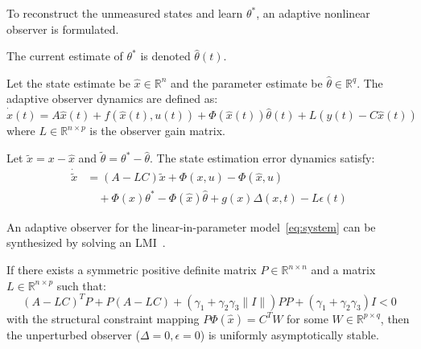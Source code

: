 \documentclass[letterpaper, 10 pt, conference]{ieeeconf}  %
\begin{document}



To reconstruct the unmeasured states and learn $\theta^*$, an adaptive nonlinear observer is formulated. 

The current estimate of $\theta^*$ is denoted $\hat\theta(t)$.

\begin{definition}
Let the state estimate be $\hat{x} \in \mathbb{R}^n$ and the parameter estimate be $\hat{\theta} \in \mathbb{R}^q$. The adaptive observer dynamics are defined as:
\begin{equation}
\dot{\hat{x}}(t) = A\hat{x}(t) + f(\hat{x}(t), u(t)) + \Phi(\hat{x}(t))\hat{\theta}(t) + L(y(t) - C\hat{x}(t))
\end{equation}
where $L \in \mathbb{R}^{n \times p}$ is the observer gain matrix. 
\end{definition}

Let $\tilde{x} = x - \hat{x}$ and $\tilde{\theta} = \theta^* - \hat{\theta}$. The state estimation error dynamics satisfy:
\begin{align}
\dot{\tilde{x}} &= (A-LC)\tilde{x} + \Phi(x,u) - \Phi(\hat{x},u) \nonumber \\
&\quad + \Phi(x)\theta^* - \Phi(\hat{x})\hat{\theta} + g(x)\Delta(x,t) - L\epsilon(t)
\end{align}

An adaptive observer for the linear-in-parameter model~\eqref{eq:system} can be synthesized by solving an LMI~\cite{cho1997systematic, besanccon2000remarks}.

If there exists a symmetric positive definite matrix $P \in \mathbb{R}^{n \times n}$ and a matrix $L \in \mathbb{R}^{n \times p}$ such that:
\begin{equation}
(A-LC)^T P + P(A-LC) + (\gamma_1 + \gamma_2 \gamma_3 \|I\|)PP + (\gamma_1 + \gamma_2 \gamma_3)I < 0
\end{equation}
with the structural constraint mapping $P \Phi(\hat{x}) = C^T W$ for some $W \in \mathbb{R}^{p \times q}$, then the unperturbed observer ($\Delta = 0, \epsilon=0$) is uniformly asymptotically stable.
\end{document}
